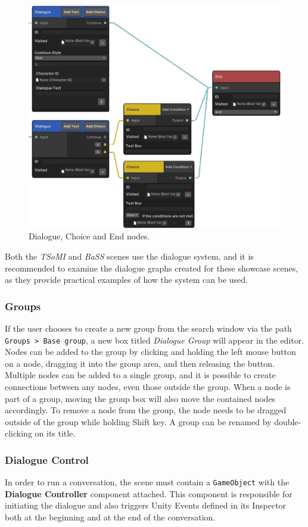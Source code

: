 \begin{figure}[H]
\centering
\includegraphics[width=1\linewidth]{img/User doc/nodes2.png}
\caption{Dialogue, Choice and End nodes.}
\label{fig:Manual-Nodes2}
\end{figure}

Both the \textit{TSoMI} and \textit{BaSS} scenes use the dialogue system, and it is recommended to examine the dialogue graphs created for these showcase scenes, as they provide practical examples of how the system can be used. 

\subsubsection{Groups}
If the user chooses to create a new group from the search window via the path \verb|Groups > Base group|, a new box titled \textit{Dialogue Group} will appear in the editor. Nodes can be added to the group by clicking and holding the left mouse button on a node, dragging it into the group area, and then releasing the button. Multiple nodes can be added to a single group, and it is possible to create connections between any nodes, even those outside the group. When a node is part of a group, moving the group box will also move the contained nodes accordingly. To remove a node from the group, the node needs to be dragged outside of the group while holding Shift key. A group can be renamed by double-clicking on its title. 

\subsubsection{Dialogue Control}
In order to run a conversation, the scene must contain a \verb|GameObject| with the \textbf{Dialogue Controller} component attached. This component is responsible for initiating the dialogue and also triggers Unity Events defined in its Inspector both at the beginning and at the end of the conversation. 


